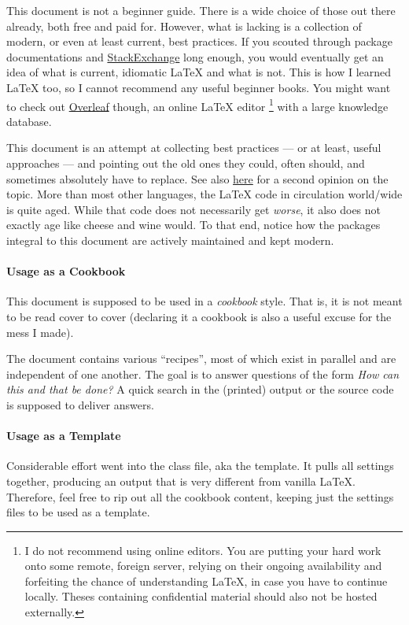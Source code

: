 
This document is not a beginner guide.
There is a wide choice of those out there already, both free and paid for.
However, what is lacking is a collection of modern, or even at least current,
best practices.
If you scouted through package documentations and
\href{https://tex.stackexchange.com/}{StackExchange}
long enough, you would eventually get an idea of what is current, idiomatic \LaTeX{}
and what is not.
This is how I learned \LaTeX{} too, so I cannot recommend any useful beginner books.
You might want to check out \href{https://www.overleaf.com/}{Overleaf} though,
an online \LaTeX{} editor%
\footnote{%
    I do not recommend using online editors.
    You are putting your hard work onto some remote, foreign server, relying on
    their ongoing availability and forfeiting the chance of understanding \LaTeX{},
    in case you have to continue locally.
    Theses containing confidential material should also not be hosted externally.
}
with a large knowledge database.

This document is an attempt at collecting best practices
--- or at least, useful approaches ---
and pointing out the old ones they could, often should, and sometimes absolutely have to replace.
See also \href{https://web.archive.org/web/20210317090850/https://user.math.uni-bremen.de/~grimpen/LaTeX.html}{here} for a second opinion on the topic.
More than most other languages, the \LaTeX{} code in circulation world\-/wide is
quite aged.
While that code does not necessarily get \emph{worse}, it also does not exactly
age like cheese and wine would.
To that end, notice how the packages integral to this document are actively
maintained and kept modern.

\paragraph{Usage as a Cookbook}
This document is supposed to be used in a \emph{cookbook} style.
That is, it is not meant to be read cover to cover
(declaring it a cookbook is also a useful excuse for the mess I made).

The document contains various \enquote{recipes}, most of which exist in parallel and
are independent of one another.
The goal is to answer questions of the form \emph{How can this and that be done?}
A quick search in the (printed) output or the source code is supposed to deliver
answers.

\paragraph{Usage as a Template}
Considerable effort went into the class file, aka the template.
It pulls all settings together, producing an output that is very different from
vanilla \LaTeX{}.
Therefore, feel free to rip out all the cookbook content, keeping just the settings
files to be used as a template.

